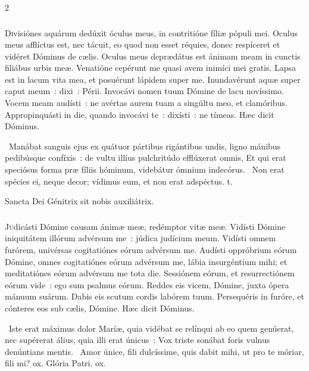 \documentclass[9pt,twoside]{extarticle}
\begin{document}
\begin{multicols}{2}
\subsubsection*{\center {}}
\lettrine{D}ivisiónes aquárum dedúxit óculus meus, in contritióne fíliæ pópuli mei.
Oculus meus afflíctus est, nec tácuit, eo quod non esset réquies,
donec respíceret et vidéret Dóminus de cælis.
Oculus meus deprædátus est ánimam meam in cunctis filiábus urbis meæ.
Venatióne cepérunt me quasi avem inimíci mei gratis.
Lapsa est in lacum vita mea, et posuérunt lápidem super me.
Inundavérunt aquæ super caput meum~: dixi~: Périi.
Invocávi nomen tuum Dómine de lacu novíssimo.
Vocem meam audísti~: ne avértas aurem tuam a singúltu meo, et clamóribus.
Appropinquásti in die, quando invocávi te~: dixísti~: ne tímeas. Hæc dicit Dóminus.

\begin{tightlist}{}
\item {}~Manábat sanguis ejus ex quátuor pártibus rigántibus undis, ligno mánibus pedibúsque confíxis~: de vultu illíus pulchritúdo efflúxerat omnis, \textred{*} Et qui erat speciósus forma præ fíliis hóminum, videbátur ómnium indecórus. ~Non erat spécies ei, neque decor; vídimus eum, et non erat adspéctus. t.
\item {\small {} Sancta Dei Génitrix sit nobis auxiliátrix.}
\end{tightlist}

\subsubsection*{\center {}}
\lettrine{J}udicásti Dómine causam ánimæ meæ, redémptor vitæ meæ.
Vidísti Dómine iniquitátem illórum advérsum me~: júdica judícium meum.
Vidísti omnem furórem, univérsas cogitatiónes eórum advérsum me.
Audísti oppróbrium eórum Dómine, omnes cogitatiónes eórum advérsum me,
lábia insurgéntium mihi; et meditatiónes eórum advérsum me tota die.
Sessiónem eórum, et resurrectiónem eórum vide~: ego sum psalmus eórum.
Reddes eis vicem, Dómine, juxta ópera mánuum suárum.
Dabis eis scutum cordis labórem tuum.
Persequéris in furóre, et cónteres eos sub cælis, Dómine. Hæc dicit Dóminus.

\begin{tightlist}{}
\item {}~Iste erat máximus dolor Maríæ, quia vidébat se relínqui ab eo quem genúerat, nec supérerat álius, quia illi erat únicus~: \textred{*} Vox triste sonábat foris vulnus denúntians mentis. ~Amor únice, fili dulcíssime, quis dabit mihi, ut pro te móriar, fili mi? ox. Glória Patri. ox.
\end{tightlist}


\end{multicols}
\end{document}
